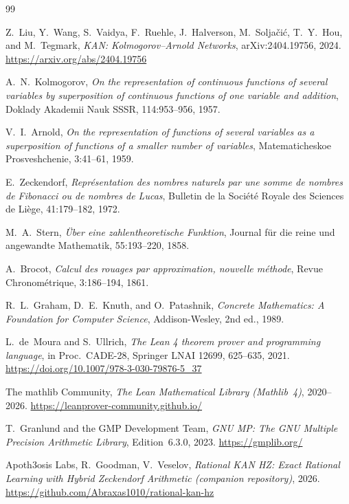 \documentclass[11pt,a4paper]{article}
\begin{document}
\begin{thebibliography}{99}

Z.~Liu, Y.~Wang, S.~Vaidya, F.~Ruehle, J.~Halverson, M.~Solja\v{c}i\'c,
T.~Y.~Hou, and M.~Tegmark,
\emph{KAN: Kolmogorov--Arnold Networks},
arXiv:2404.19756, 2024.
\url{https://arxiv.org/abs/2404.19756}

A.~N.~Kolmogorov,
\emph{On the representation of continuous functions of several
variables by superposition of continuous functions of one variable and
addition},
Doklady Akademii Nauk SSSR, 114:953--956, 1957.

V.~I.~Arnold,
\emph{On the representation of functions of several variables as a
superposition of functions of a smaller number of variables},
Matematicheskoe Prosveshchenie, 3:41--61, 1959.

E.~Zeckendorf,
\emph{Repr\'esentation des nombres naturels par une somme de nombres de
Fibonacci ou de nombres de Lucas},
Bulletin de la Soci\'et\'e Royale des Sciences de Li\`ege, 41:179--182,
1972.

M.~A.~Stern,
\emph{\"Uber eine zahlentheoretische Funktion},
Journal f\"ur die reine und angewandte Mathematik, 55:193--220, 1858.

A.~Brocot,
\emph{Calcul des rouages par approximation, nouvelle m\'ethode},
Revue Chronom\'etrique, 3:186--194, 1861.

R.~L.~Graham, D.~E.~Knuth, and O.~Patashnik,
\emph{Concrete Mathematics: A Foundation for Computer Science},
Addison-Wesley, 2nd ed., 1989.

L.~de~Moura and S.~Ullrich,
\emph{The Lean 4 theorem prover and programming language},
in Proc.\ CADE-28, Springer LNAI 12699, 625--635, 2021.
\url{https://doi.org/10.1007/978-3-030-79876-5_37}

The mathlib Community,
\emph{The Lean Mathematical Library (Mathlib~4)},
2020--2026. \url{https://leanprover-community.github.io/}

T.~Granlund and the GMP Development Team,
\emph{GNU MP: The GNU Multiple Precision Arithmetic Library},
Edition~6.3.0, 2023. \url{https://gmplib.org/}

Apoth3osis Labs, R.~Goodman, V.~Veselov,
\emph{Rational KAN HZ: Exact Rational Learning with Hybrid Zeckendorf
Arithmetic (companion repository)},
2026.
\url{https://github.com/Abraxas1010/rational-kan-hz}

\end{thebibliography}
\end{document}
